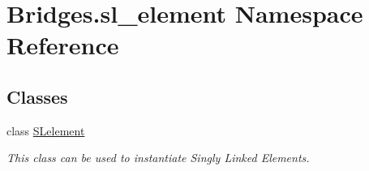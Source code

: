 \hypertarget{namespace_bridges_1_1sl__element}{}\section{Bridges.\+sl\+\_\+element Namespace Reference}
\label{namespace_bridges_1_1sl__element}
\subsection*{Classes}
\begin{DoxyCompactItemize}
\item 
class \mbox{\hyperlink{class_bridges_1_1sl__element_1_1_s_lelement}{S\+Lelement}}
\begin{DoxyCompactList}\small\item\em This class can be used to instantiate Singly Linked Elements. \end{DoxyCompactList}\end{DoxyCompactItemize}
